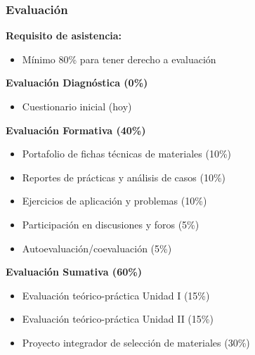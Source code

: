 \documentclass{beamer}
\begin{document}
\begin{frame}
    \frametitle{Evaluación}
    
    \textbf{Requisito de asistencia:}
    \begin{itemize}
        \item Mínimo 80\% para tener derecho a evaluación
    \end{itemize}
    \vspace{0.2cm}
    
    \textbf{Evaluación Diagnóstica (0\%)}
    \begin{itemize}
        \item Cuestionario inicial (hoy)
    \end{itemize}
    \vspace{0.2cm}
    
    \textbf{Evaluación Formativa (40\%)}
    \begin{itemize}
        \item Portafolio de fichas técnicas de materiales (10\%)
        \item Reportes de prácticas y análisis de casos (10\%)
        \item Ejercicios de aplicación y problemas (10\%)
        \item Participación en discusiones y foros (5\%)
        \item Autoevaluación/coevaluación (5\%)
    \end{itemize}
    \vspace{0.2cm}
    
    \textbf{Evaluación Sumativa (60\%)}
    \begin{itemize}
        \item Evaluación teórico-práctica Unidad I (15\%)
        \item Evaluación teórico-práctica Unidad II (15\%)
        \item Proyecto integrador de selección de materiales (30\%)
    \end{itemize}
\end{frame}
\end{document}
